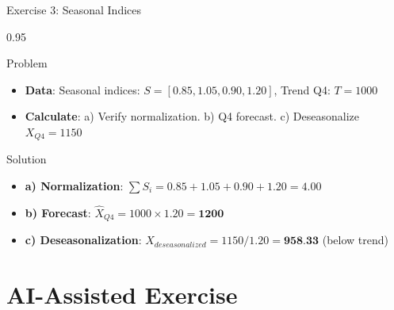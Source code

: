 \documentclass[9pt, aspectratio=169, t]{beamer}
\begin{document}
\begin{frame}{Exercise 3: Seasonal Indices}
    \begin{cminipage}{0.95\textwidth}
    \begin{alertblock}{Problem}
        \begin{itemize}\setlength{\itemsep}{0pt}
            \item \textbf{Data}: Seasonal indices: $S = [0.85, 1.05, 0.90, 1.20]$, Trend Q4: $T = 1000$
            \item \textbf{Calculate}: a) Verify normalization. b) Q4 forecast. c) Deseasonalize $X_{Q4} = 1150$
        \end{itemize}
    \end{alertblock}

    \vspace{0.2cm}
    \begin{exampleblock}{Solution}
        \begin{itemize}\setlength{\itemsep}{0pt}
            \item \textbf{a) Normalization}: $\sum S_i = 0.85+1.05+0.90+1.20 = 4.00$ \checkmark
            \item \textbf{b) Forecast}: $\hat{X}_{Q4} = 1000 \times 1.20 = \textbf{1200}$
            \item \textbf{c) Deseasonalization}: $X_{deseasonalized} = 1150/1.20 = \textbf{958.33}$ (below trend)
        \end{itemize}
    \end{exampleblock}
    \end{cminipage}
\end{frame}

\section{AI-Assisted Exercise}
\end{document}
